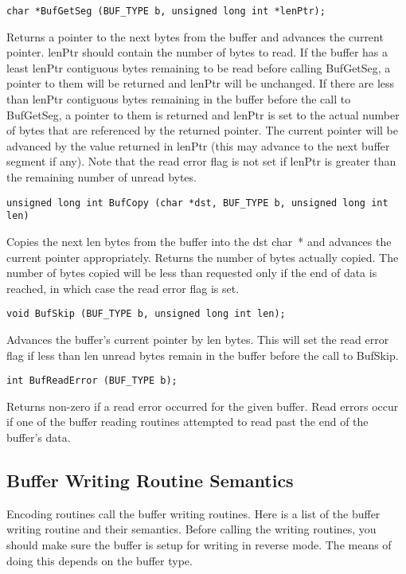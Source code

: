 \begin{verbatim}
char *BufGetSeg (BUF_TYPE b, unsigned long int *lenPtr);
\end{verbatim}
Returns a pointer to the next bytes from the buffer and advances the
current pointer. {\C *lenPtr} should contain the number of bytes to
read.  If the buffer has a least {\C *lenPtr} contiguous bytes
remaining to be read before calling {\C BufGetSeg}, a pointer to
them will be returned and {\C *lenPtr} will be unchanged.  If there
are less than {\C *lenPtr} contiguous bytes remaining in the buffer
before the call to {\C BufGetSeg}, a pointer to them is returned and
{\C *lenPtr} is set to the actual number of bytes that are
referenced by the returned pointer.  The current pointer will be
advanced by the value returned in {\C *lenPtr} (this may advance to the
next buffer segment if any).  Note that the read error flag is not set
if  {\C *lenPtr} is greater than the remaining number of unread
bytes.

\begin{verbatim}
unsigned long int BufCopy (char *dst, BUF_TYPE b, unsigned long int len)
\end{verbatim}
Copies the next {\C len} bytes from the buffer into the {\C dst char~*}
and advances the current pointer appropriately.  Returns the
number of bytes actually copied.  The number of bytes copied will be
less than requested only if the end of data is reached, in which case
the read error flag is set.


\begin{verbatim}
void BufSkip (BUF_TYPE b, unsigned long int len);
\end{verbatim}
Advances the buffer's current pointer by {\C len} bytes.  This will set the
read error flag if less than {\C len} unread bytes remain in the
buffer before the call to {\C BufSkip}.

\begin{verbatim}
int BufReadError (BUF_TYPE b);
\end{verbatim}
Returns non-zero if a read error occurred for the given buffer.
Read errors occur if one of the buffer reading routines attempted to
read past the end of the buffer's data.

\subsection{\label{buf-write-c-section}Buffer Writing Routine Semantics}

Encoding routines call the buffer writing routines.  Here is a list of
the buffer writing routine and their semantics.  Before calling the
writing routines, you should make sure the buffer is setup for
writing in reverse mode.  The means of doing this depends on the
buffer type.

